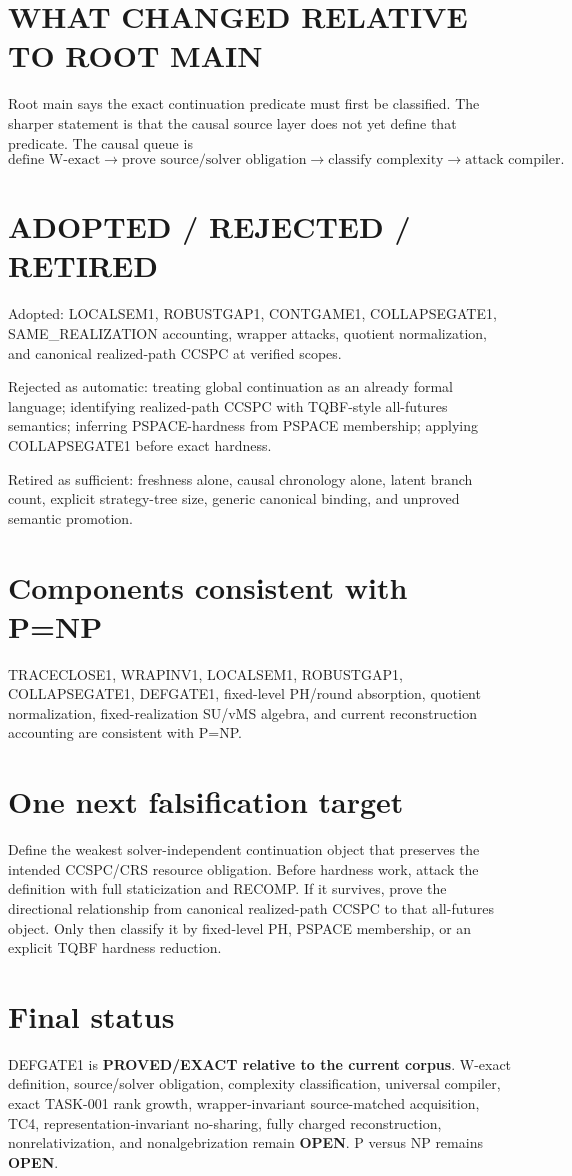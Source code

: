 \documentclass[11pt]{article}
\begin{document}
\section*{WHAT CHANGED RELATIVE TO ROOT MAIN}
Root main says the exact continuation predicate must first be classified. The sharper statement is that the causal source layer does not yet define that predicate. The causal queue is
\[
\text{define W-exact}\to\text{prove source/solver obligation}\to
\text{classify complexity}\to\text{attack compiler}.
\]

\section*{ADOPTED / REJECTED / RETIRED}
Adopted: LOCALSEM1, ROBUSTGAP1, CONTGAME1, COLLAPSEGATE1, SAME\_REALIZATION accounting, wrapper attacks, quotient normalization, and canonical realized-path CCSPC at verified scopes.

Rejected as automatic: treating global continuation as an already formal language; identifying realized-path CCSPC with TQBF-style all-futures semantics; inferring PSPACE-hardness from PSPACE membership; applying COLLAPSEGATE1 before exact hardness.

Retired as sufficient: freshness alone, causal chronology alone, latent branch count, explicit strategy-tree size, generic canonical binding, and unproved semantic promotion.

\section*{Components consistent with P=NP}
TRACECLOSE1, WRAPINV1, LOCALSEM1, ROBUSTGAP1, COLLAPSEGATE1, DEFGATE1, fixed-level PH/round absorption, quotient normalization, fixed-realization SU/vMS algebra, and current reconstruction accounting are consistent with P=NP.

\section*{One next falsification target}
Define the weakest solver-independent continuation object that preserves the intended CCSPC/CRS resource obligation. Before hardness work, attack the definition with full staticization and RECOMP. If it survives, prove the directional relationship from canonical realized-path CCSPC to that all-futures object. Only then classify it by fixed-level PH, PSPACE membership, or an explicit TQBF hardness reduction.

\section*{Final status}
DEFGATE1 is \textbf{PROVED/EXACT relative to the current corpus}. W-exact definition, source/solver obligation, complexity classification, universal compiler, exact TASK-001 rank growth, wrapper-invariant source-matched acquisition, TC4, representation-invariant no-sharing, fully charged reconstruction, nonrelativization, and nonalgebrization remain \textbf{OPEN}. P versus NP remains \textbf{OPEN}.

\end{document}
